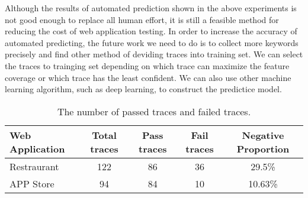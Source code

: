 Although the results of automated prediction shown in the above experiments is not good enough to replace all human effort,
it is still a feasible method for reducing the cost of web application testing.
In order to increase the accuracy of automated predicting,
the future work we need to do is to collect more keywords precisely and find other method of deviding traces into training set.
We can select the traces to trainging set depending on which trace can maximize the feature coverage or which trace has the least confident.
We can also use other machine learning algorithm, such as deep learning, to construct the predictice model.

\begin{table}[ht]
	\begin{center}
		\begin{tabular}{ | l | c | c | c | c | }%
			\hline%
			Web Application & Total traces & Pass traces & Fail traces &  Negative Proportion \\ \hline
			Restraurant & 122 & 86 & 36 & 29.5\% \\ \hline
			APP Store & 94 & 84 & 10 & 10.63\% \\ \hline
		\end{tabular}
		\caption{ The number of passed traces and failed traces. }
		\label{WebtracesProporiton}
	\end{center}
\end{table}


